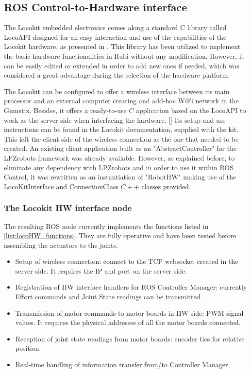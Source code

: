 \subsection{ROS Control-to-Hardware interface} %
\label{sub:ros_control_hardware_locokit_interface}
The Locokit embedded electronics comes along a standard C library called LocoAPI designed for an easy interaction and use of the capabilities of the Locokit hardware, as presented in \cite{locokit}.
This library has been utilized to implement the basic hardware functionalities in Rubi without any modification.
However, it can be easily edited or extended in order to add new ones if needed, which was considered a great advantage during the selection of the hardware platform.

The Locokit can be configured to offer a wireless interface between its main processor and an external computer creating and add-hoc WiFi network in the Gumstix.
Besides, it offers a ready-to-use $C$ application based on the LocoAPI to work as the server side when interfacing the hardware. \ref{} %
Its setup and use instructions can be found in the Locokit documentation, supplied with the kit.
This left the client side of the wireless connection as the one that needed to be created.
An existing client application built as an "AbstractController" for the LPZrobots framework was already available. 
However, as explained before, to eliminate any dependency with LPZrobots and in order to use it within ROS Control, it was rewritten as an instantiation of "RobotHW" making use of the LocoKitInterface and ConnectionClass $C++$ classes provided.

\subsubsection{The Locokit HW interface node} %
\label{ssub:the_locokit_hw_interface}
The resulting ROS node currently implements the functions listed in \ref{list:locoHW_functions}.
They are fully operative and have been tested before assembling the actuators to the joints.

\begin{itemize}
\label{list:locoHW_functions}
	\item Setup of wireless connection: connect to the TCP websocket created in the server side. It requires the IP and port on the server side.
	\item Registration of HW interface handlers for ROS Controller Manager: currently Effort commands and Joint State readings can be transmitted.
	\item Transmission of motor commands to motor boards in HW side: PWM signal values. It requires the physical addresses of all the motor boards connected.
	\item Reception of joint state readings from motor boards: encoder tics for relative position
	\item Real-time handling of information transfer from/to Controller Manager
\end{itemize}

